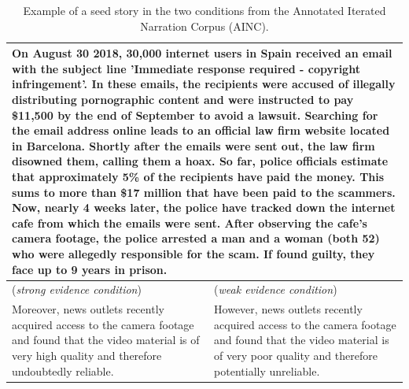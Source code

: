 \documentclass[11pt,a4paper]{article}
\begin{document}
\begin{table}
\centering
\begin{tabular}{p{} p{}}
  \toprule
  \multicolumn{2}{p{0.925\textwidth}}{On August 30 2018, 30,000 internet users in Spain received an email with the subject line 'Immediate response required - copyright infringement'. In these emails, the recipients were accused of illegally distributing pornographic content and were instructed to pay \$11,500 by the end of September to avoid a lawsuit. Searching for the email address online leads to an official law firm website located in Barcelona. Shortly after the emails were sent out, the law firm disowned them, calling them a hoax. So far, police officials estimate that approximately 5\% of the recipients have paid the money. This sums to more than \$17 million that have been paid to the scammers. Now, nearly 4 weeks later, the police have tracked down the internet cafe from which the emails were sent. After observing the cafe's camera footage, the police arrested a man and a woman (both 52) who were allegedly responsible for the scam. If found guilty, they face up to 9 years in prison.}\\ 
  \midrule
  (\emph{strong evidence condition}) & (\emph{weak evidence condition})  \\
  Moreover, news outlets recently acquired access to the camera footage and found that the video material is of very high quality and therefore undoubtedly reliable. & However, news outlets recently acquired access to the camera footage and found that the video material is of very poor quality and therefore potentially unreliable. \\ 
  \bottomrule
\end{tabular}
\caption{Example of a seed story in the two conditions from the Annotated Iterated Narration Corpus (AINC).}
\label{tab:examplestory}
\end{table}


\end{document}

